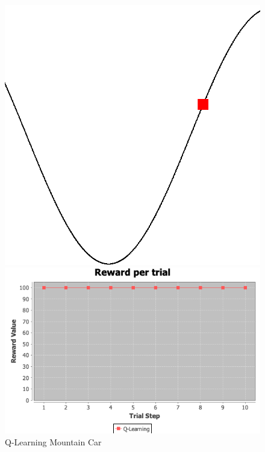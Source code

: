 \documentclass[11pt]{article}
\newcommand{\problemtwo}{Mountain Car}
\begin{document}
    \begin{figure}
        \begin{minipage}{0.5\textwidth}
            \centering
            \includegraphics[width=1\linewidth]{mcgif.png}
            \caption{Mountain Car Domain}\label{Fig:Mountain Car}
        \end{minipage}
        \begin{minipage}{0.5\textwidth}
            \centering
            \includegraphics[width=1\linewidth]{qlearningproblem2.png}
            \caption{Q-Learning \problemtwo}\label{Fig:Q-Learning \problemtwo}
        \end{minipage}
    \end{figure}
\end{document}
